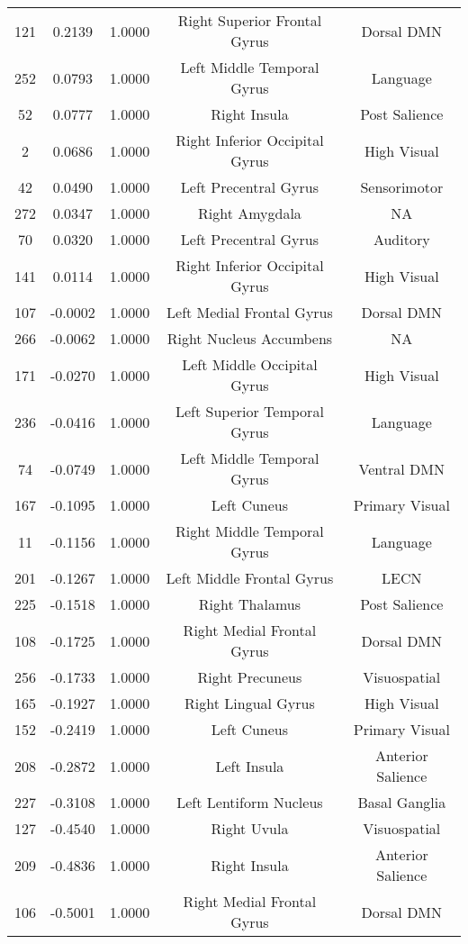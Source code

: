\documentclass[10pt,letterpaper]{article}\usepackage[]{graphicx}\usepackage[]{color}
\begin{document}
\begin{center}
\begin{longtable}[c]{ccccc}
	121	& 0.2139 & 1.0000 & Right Superior Frontal Gyrus & Dorsal DMN \\
	252	& 0.0793 & 1.0000 & Left Middle Temporal Gyrus & Language \\
	52	& 0.0777 & 1.0000 & Right Insula & Post Salience \\
	2	& 0.0686 & 1.0000 & Right Inferior Occipital Gyrus & High Visual \\
	42	& 0.0490 & 1.0000 & Left Precentral Gyrus & Sensorimotor \\
	272	& 0.0347 & 1.0000 & Right Amygdala & NA \\
	70	& 0.0320 & 1.0000 & Left Precentral Gyrus & Auditory \\
	141	& 0.0114 & 1.0000 & Right Inferior Occipital Gyrus & High Visual \\
	107	& -0.0002 & 1.0000 & Left Medial Frontal Gyrus & Dorsal DMN \\
	266	& -0.0062 & 1.0000 & Right Nucleus Accumbens & NA \\
	171	& -0.0270 & 1.0000 & Left Middle Occipital Gyrus & High Visual \\
	236	& -0.0416 & 1.0000 & Left Superior Temporal Gyrus & Language \\
	74	& -0.0749 & 1.0000 & Left Middle Temporal Gyrus & Ventral DMN \\
	167	& -0.1095 & 1.0000 & Left Cuneus & Primary Visual \\
	11	& -0.1156 & 1.0000 & Right Middle Temporal Gyrus & Language \\
	201	& -0.1267 & 1.0000 & Left Middle Frontal Gyrus & LECN \\
	225	& -0.1518 & 1.0000 & Right Thalamus & Post Salience \\
	108	& -0.1725 & 1.0000 & Right Medial Frontal Gyrus & Dorsal DMN \\
	256	& -0.1733 & 1.0000 & Right Precuneus & Visuospatial \\
	165	& -0.1927 & 1.0000 & Right Lingual Gyrus & High Visual \\
	152	& -0.2419 & 1.0000 & Left Cuneus & Primary Visual \\
	208	& -0.2872 & 1.0000 & Left Insula & Anterior Salience \\
	227	& -0.3108 & 1.0000 & Left Lentiform Nucleus & Basal Ganglia \\
	127	& -0.4540 & 1.0000 & Right Uvula & Visuospatial \\
	209	& -0.4836 & 1.0000 & Right Insula & Anterior Salience \\
	106	& -0.5001 & 1.0000 & Right Medial Frontal Gyrus & Dorsal DMN \\

\end{longtable}
\end{center}
\end{document}
